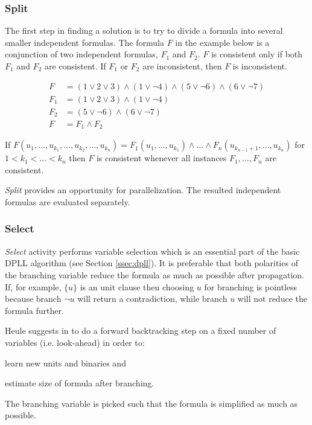 \subsubsection{Split}
\label{sssec:split}

The first step in finding a solution is to try to divide a formula
into several smaller independent formulas.  The formula $F$ in
the example below is a conjunction of two independent formulas,
$F_1$ and $F_2$. $F$ is consistent only if both $F_1$ and $F_2$
are consistent. If $F_1$ or $F_2$ are inconsistent, then $F$
is inconsistent.

\begin{align}
  F &= (1 \lor 2 \lor 3) \land (1 \lor \neg 4) \land (5 \lor \neg 6) \land (6 \lor \neg 7) \\
  F_1 &= (1 \lor 2 \lor 3) \land (1 \lor \neg 4) \\
  F_2 &= (5 \lor \neg 6) \land (6 \lor \neg 7) \\
  F &= F_1 \land F_2
\end{align}

\begin{myprop}
  If $F(u_1, \ldots, u_{k_1}, \ldots, u_{k_2}, \ldots, u_{k_n}) =
  F_1(u_1, \ldots, u_{k_1}) \land \ldots \land F_n(u_{k_{n-1}+1},
  \ldots, u_{k_n})$ for $1 < k_1 < \ldots <k_n$ then $F$
  is consistent whenever all instances $F_1, \ldots, F_n$
  are consistent.
\end{myprop}

\emph{Split} provides an opportunity for parallelization. The
resulted independent formulas are evaluated separately.


\subsubsection{Select}
\label{ssec:branching}

\emph{Select} activity performs variable selection which is
an essential part of the basic DPLL algorithm (see Section
\ref{ssec:dpll}).  It is preferable that both polarities of the
branching variable reduce the formula as much as possible after
propagation.  If, for example, $\{ u \}$ is an unit clause then
choosing $u$ for branching is pointless because branch $\neg u$
will return a contradiction, while branch $u$ will not reduce the
formula further.

Heule suggests in \cite{mine:march} to do a forward
backtracking step on a fixed number of variables (i.e. look-ahead)
in order to:
\begin{inparaenum}[a)]
  \item learn new units and binaries and
  \item estimate size of formula after branching.
\end{inparaenum} The branching variable is picked such that
the formula is simplified as much as possible.

